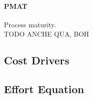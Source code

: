 \paragraph{PMAT} Process maturity. \\
TODO ANCHE QUA, BOH

\subsection{Cost Drivers} %
\label{sub:cost_drivers}

\subsection{Effort Equation} %
\label{sub:effort_equation}
